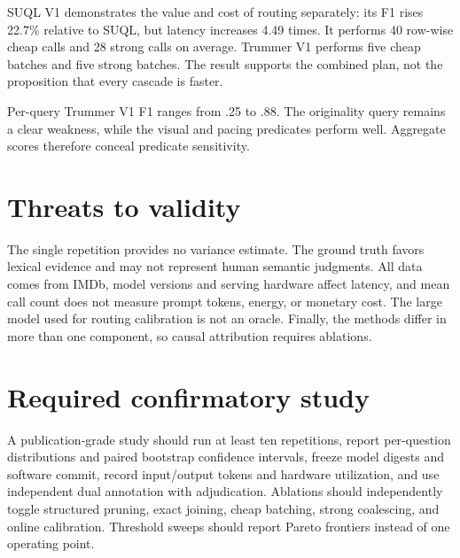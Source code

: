 SUQL V1 demonstrates the value and cost of routing separately: its F1 rises 22.7\%
relative to SUQL, but latency increases 4.49 times. It performs 40 row-wise cheap
calls and 28 strong calls on average. Trummer V1 performs five cheap batches and
five strong batches. The result supports the combined plan, not the proposition
that every cascade is faster.

Per-query Trummer V1 F1 ranges from .25 to .88. The originality query remains a
clear weakness, while the visual and pacing predicates perform well. Aggregate
scores therefore conceal predicate sensitivity.

\section{Threats to validity}
The single repetition provides no variance estimate. The ground truth favors
lexical evidence and may not represent human semantic judgments. All data comes
from IMDb, model versions and serving hardware affect latency, and mean call count
does not measure prompt tokens, energy, or monetary cost. The large model used for
routing calibration is not an oracle. Finally, the methods differ in more than one
component, so causal attribution requires ablations.

\section{Required confirmatory study}
A publication-grade study should run at least ten repetitions, report per-question
distributions and paired bootstrap confidence intervals, freeze model digests and
software commit, record input/output tokens and hardware utilization, and use
independent dual annotation with adjudication. Ablations should independently
toggle structured pruning, exact joining, cheap batching, strong coalescing, and
online calibration. Threshold sweeps should report Pareto frontiers instead of one
operating point.
